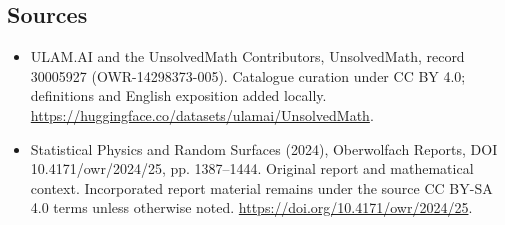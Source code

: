 \documentclass[11pt]{article}
\begin{document}
\subsection{Sources}
\begin{itemize}
\item[\hypertarget{source:30005927:1}{S1}] ULAM.AI and the UnsolvedMath Contributors, UnsolvedMath, record 30005927 (OWR-14298373-005). Catalogue curation under CC BY 4.0; definitions and English exposition added locally.
\url{https://huggingface.co/datasets/ulamai/UnsolvedMath}.
\item[\hypertarget{source:30005927:2}{S2}] Statistical Physics and Random Surfaces (2024), Oberwolfach Reports, DOI 10.4171/owr/2024/25, pp. 1387--1444. Original report and mathematical context. Incorporated report material remains under the source CC BY-SA 4.0 terms unless otherwise noted.
\url{https://doi.org/10.4171/owr/2024/25}.
\end{itemize}
\label{end:30005927}
\end{document}
